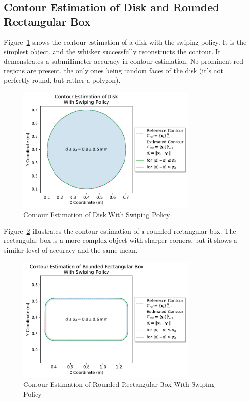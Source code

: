 \subsection{Contour Estimation of Disk and Rounded Rectangular Box}
Figure~\ref{fig:experiment-disk-swiping} shows the contour estimation of a disk with the swiping policy.
It is the simplest object, and the whisker successfully reconstructs the contour.
It demonstrates a submillimeter accuracy in contour estimation.
No prominent red regions are present, the only ones being random faces of the disk (it's not perfectly round, but rather a polygon).

\begin{figure}[htb]
    \centering
    \includegraphics[width=0.8\textwidth]{figures/experiments/disk-swiping}
    \caption{Contour Estimation of Disk With Swiping Policy}
    \label{fig:experiment-disk-swiping}
\end{figure}

Figure~\ref{fig:experiment-rounded-rectangular-box-swiping} illustrates the contour estimation of a rounded rectangular box.
The rectangular box is a more complex object with sharper corners, but it shows a similar level of accuracy and the same mean.

\begin{figure}[htb]
    \centering
    \includegraphics[width=0.8\textwidth]{figures/experiments/rounded-rectangular-box-swiping}
    \caption{Contour Estimation of Rounded Rectangular Box With Swiping Policy}
    \label{fig:experiment-rounded-rectangular-box-swiping}
\end{figure}

